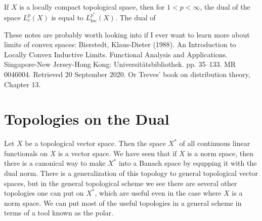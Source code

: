 \begin{example}
    If $X$ is a locally compact topological space, then for $1 < p < \infty$, the dual of the space $L^p_c(X)$ is equal to $L^{p^*}_{\text{loc}}(X)$. The dual of 
\end{example}

These notes are probably worth looking into if I ever want to learn more about limits of convex spaces: Bierstedt, Klaus-Dieter (1988). An Introduction to Locally Convex Inductive Limits. Functional Analysis and Applications. Singapore-New Jersey-Hong Kong: Universitätsbibliothek. pp. 35–133. MR 0046004. Retrieved 20 September 2020. Or Treves' book on distribution theory, Chapter 13.






\section{Topologies on the Dual}

Let $X$ be a topological vector space. Then the space $X^*$ of all continuous linear functionals on $X$ is a vector space. We have seen that if $X$ is a norm space, then there is a canonical way to make $X^*$ into a Banach space by equpping it with the dual norm. There is a generalization of this topology to general topological vector spaces, but in the general topological scheme we see there are several other topologies one can put on $X^*$, which are useful even in the case where $X$ is a norm space. We can put most of the useful topologies in a general scheme in terms of a tool known as the polar.

